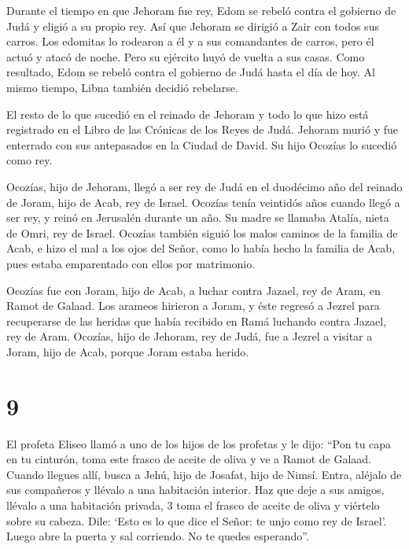  Durante el tiempo en que Jehoram fue rey, Edom se rebeló
contra el gobierno de Judá y eligió a su propio rey.  Así
que Jehoram se dirigió a Zair con todos sus carros. Los edomitas lo
rodearon a él y a sus comandantes de carros, pero él actuó y atacó de
noche. Pero su ejército huyó de vuelta a sus casas.  Como
resultado, Edom se rebeló contra el gobierno de Judá hasta el día de
hoy. Al mismo tiempo, Libna también decidió rebelarse.

 El resto de lo que sucedió en el reinado de Jehoram y todo
lo que hizo está registrado en el Libro de las Crónicas de los Reyes de
Judá.  Jehoram murió y fue enterrado con sus antepasados en
la Ciudad de David. Su hijo Ocozías lo sucedió como rey.

 Ocozías, hijo de Jehoram, llegó a ser rey de Judá en el
duodécimo año del reinado de Joram, hijo de Acab, rey de Israel.
 Ocozías tenía veintidós años cuando llegó a ser rey, y
reinó en Jerusalén durante un año. Su madre se llamaba Atalía, nieta de
Omri, rey de Israel.  Ocozías también siguió los malos
caminos de la familia de Acab, e hizo el mal a los ojos del Señor, como
lo había hecho la familia de Acab, pues estaba emparentado con ellos por
matrimonio.

 Ocozías fue con Joram, hijo de Acab, a luchar contra
Jazael, rey de Aram, en Ramot de Galaad. Los arameos hirieron a Joram,
 y éste regresó a Jezrel para recuperarse de las heridas
que había recibido en Ramá luchando contra Jazael, rey de Aram. Ocozías,
hijo de Jehoram, rey de Judá, fue a Jezrel a visitar a Joram, hijo de
Acab, porque Joram estaba herido.

\hypertarget{section-8}{%
\section{9}\label{section-8}}

 El profeta Eliseo llamó a uno de los hijos de los profetas
y le dijo: ``Pon tu capa en tu cinturón, toma este frasco de aceite de
oliva y ve a Ramot de Galaad.  Cuando llegues allí, busca a
Jehú, hijo de Josafat, hijo de Nimsí. Entra, aléjalo de sus compañeros y
llévalo a una habitación interior. Haz que deje a sus amigos, llévalo a
una habitación privada, 3 toma el frasco de aceite de oliva y viértelo
sobre su cabeza. Dile: `Esto es lo que dice el Señor: te unjo como rey
de Israel'. Luego abre la puerta y sal corriendo. No te quedes
esperando''.


